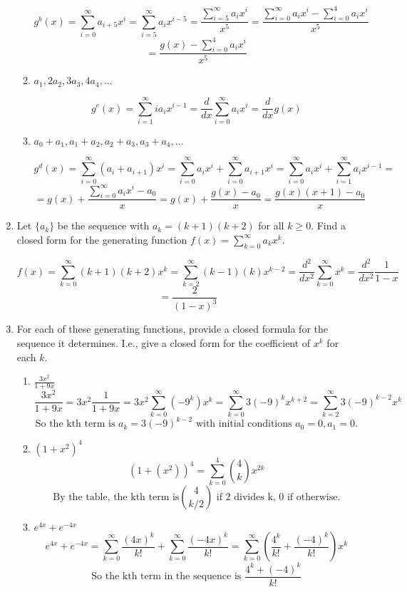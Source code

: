 \documentclass[12pt]{article}
\begin{document}
\begin{enumerate}
\begin{enumerate}
\[g^b(x) =  \sum_{i=0}^{\infty}a_{i+5}x^i = \sum_{i=5}^{\infty}a_{i}x^{i-5} = \frac{\sum_{i=5}^{\infty}a_{i}x^{i}}{x^5}=\frac{\sum_{i=0}^{\infty}a_{i}x^{i}-\sum_{i=0}^{4}a_ix^i}{x^5}\]
\[= \frac{g(x)-\sum_{i=0}^{4}a_ix^i}{x^5}\]

\item $a_1, 2a_2, 3a_3, 4a_4, \ldots$

\[g^c(x) =\sum_{i=1}^{\infty}ia_ix^{i-1} = \frac{d}{dx}\sum_{i=0}^{\infty}a_ix^i = \frac{d}{dx}g(x) \]

\item $a_0 + a_1, a_1 + a_2, a_2 + a_3, a_3 + a_4, \ldots$ 

\[g^d(x) = \sum_{i=0}^{\infty}(a_i+a_{i+1})x^{i} = \sum_{i=0}^{\infty}a_ix^i +\sum_{i=0}^{\infty}a_{i+1}x^i = \sum_{i=0}^{\infty}a_ix^i +\sum_{i=1}^{\infty}a_{i}x^{i-1}= \]
\[=g(x) +\frac{\sum_{i=0}^{\infty}a_{i}x^{i} -a_0}{x} = g(x) + \frac{g(x) - a_0}{x}= \frac{g(x)(x+1)-a_0}{x}\]

\end{enumerate}

\medskip

\item Let $\{a_k\}$ be the sequence with $a_k = (k+1)(k+2)$ for all $k \geq 0$. Find a closed form for the generating function $f(x) =\sum_{k=0}^\infty a_k x^k$. 

\[f(x)=\sum_{k=0}^\infty (k+1)(k+2) x^k = \sum_{k=2}^\infty (k-1)(k) x^{k-2} = \frac{d^2}{dx^2} \sum_{k=0}^\infty x^k = \frac{d^2}{dx^2} \frac{1}{1-x}\]
\[= \frac{2}{(1-x)^3}\]

\medskip

\item For each of these generating functions, provide a closed
formula for the sequence it determines. I.e., give a closed form for the coefficient of $x^k$ for each $k$.
\begin{enumerate}
\item $\frac{3x^2}{1+9x}$
\[\frac{3x^2}{1+9x} = 3x^2\frac{1}{1+9x} = 3x^2\sum_{k=0}^{\infty}(-9^k)x^k = \sum_{k=0}^{\infty}3(-9)^kx^{k+2} = \sum_{k=2}^{\infty}3(-9)^{k-2}x^k\]
\[\text{So the kth term is } a_k=3(-9)^{k-2} \text{ with initial conditions } a_0=0,a_1=0.\]

\item $(1+x^2)^4$
\[(1+(x^2))^4 = \sum_{k=0}^{4}\binom{4}{k}x^{2k}\]
\[\text{By the table, the kth term is} \binom{4}{k/2} \text{ if 2 divides k, 0 if otherwise.}\]

\item $e^{4x} +e^{-4x}$
\[e^{4x}+e^{-4x} = \sum_{k=0}^\infty \frac{(4x)^k}{k!} +\sum_{k=0}^\infty \frac{(-4x)^k}{k!} = \sum_{k=0}^\infty(\frac{4^k}{k!}+\frac{(-4)^k}{k!})x^k\]
\[\text{So the kth term in the sequence is } \frac{4^k+(-4)^k}{k!}\]
\end{enumerate}


\end{enumerate}
\end{document}
